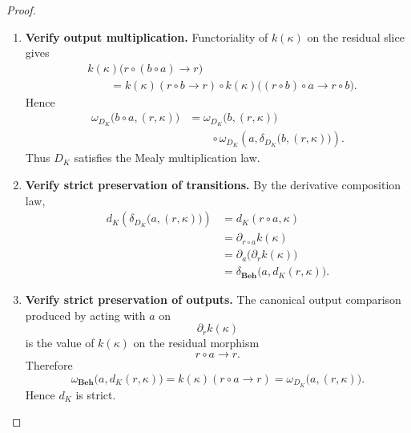 \begin{proof}
\begin{enumerate}
        \item \textbf{Verify output multiplication.}
        Functoriality of \(k(\kappa)\) on the residual slice gives
        \[
        \begin{aligned}
            &k(\kappa)
            \bigl(
                r\circ(b\circ a)\to r
            \bigr)
            \\
            &\qquad=
            k(\kappa)(r\circ b\to r)
            \circ
            k(\kappa)
            \bigl(
                (r\circ b)\circ a\to r\circ b
            \bigr).
        \end{aligned}
        \]
        Hence
        \[
        \begin{aligned}
            \omega_{D_K}
            \bigl(
                b\circ a,(r,\kappa)
            \bigr)
            &=
            \omega_{D_K}
            \bigl(
                b,(r,\kappa)
            \bigr)
            \\
            &\qquad\circ
            \omega_{D_K}
            \left(
                a,
                \delta_{D_K}
                \bigl(
                    b,(r,\kappa)
                \bigr)
            \right).
        \end{aligned}
        \]
        Thus \(D_K\) satisfies the Mealy multiplication law.

        \item \textbf{Verify strict preservation of transitions.}
        By the derivative composition law,
        \[
        \begin{aligned}
            d_K
            \left(
                \delta_{D_K}
                \bigl(
                    a,(r,\kappa)
                \bigr)
            \right)
            &=
            d_K(r\circ a,\kappa)
            \\
            &=
            \partial_{r\circ a}k(\kappa)
            \\
            &=
            \partial_a
            \bigl(
                \partial_rk(\kappa)
            \bigr)
            \\
            &=
            \delta_{\mathbf{Beh}}
            \bigl(
                a,d_K(r,\kappa)
            \bigr).
        \end{aligned}
        \]

        \item \textbf{Verify strict preservation of outputs.}
        The canonical output comparison produced by acting with \(a\) on
        \[
            \partial_rk(\kappa)
        \]
        is the value of \(k(\kappa)\) on the residual morphism
        \[
            r\circ a\to r.
        \]
        Therefore
        \[
            \omega_{\mathbf{Beh}}
            \bigl(
                a,d_K(r,\kappa)
            \bigr)
            =
            k(\kappa)(r\circ a\to r)
            =
            \omega_{D_K}
            \bigl(
                a,(r,\kappa)
            \bigr).
        \]
        Hence \(d_K\) is strict.


\end{enumerate}
\end{proof}
